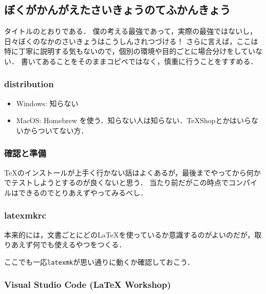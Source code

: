 \documentclass[./main]{subfiles}
\begin{document}
\appendix
{}
\renewcommand{\thesubsection}{\Alph{subsection}}
\makeatletter
	\renewcommand{\theequation}{\thesubsection.\arabic{equation}}
	\renewcommand{\thefigure}{\thesubsection.\arabic{figure}}
	\renewcommand{\thetable}{\thesubsection.\arabic{table}}
\makeatother

\setcounter{equation}{0}

\section*{\appendixname}

\markboth{\appendixname}{}

\subsection{ぼくがかんがえたさいきょうのてふかんきょう}
\noindent
タイトルのとおりである．
僕の考える最強であって，実際の最強ではないし，日々ぼくのなかのさいきょうはこうしんされつづける！
さらに言えば，ここは特に丁寧に説明する気もないので，個別の環境や目的ごとに場合分けをしていない．
書いてあることをそのままコピペではなく，慎重に行うことをすすめる．

\subsubsection{distribution}
\begin{itemize}
  \item Windows: 知らない
  \item MacOS: Homebrew を使う．知らない人は知らない．\TeX Shopとかはいらないからついてない方．
\end{itemize}
\subsubsection{確認と準備}
\TeX のインストールが上手く行かない話はよくあるが，最後までやってから何かでテストしようとするのが良くないと思う．
当たり前だがこの時点でコンパイルはできるのでとりあえずやってみるべし．
\subsubsection{latexmkrc}
本来的には，文書ごとにどの\LaTeX を使っているか意識するのがよいのだが，取りあえず何でも使えるやつをつくる．

ここでも一応\verb|latexmk|が思い通りに動くか確認しておこう．
\subsubsection{Visual Studio Code (LaTeX Workshop)}
\end{document}

